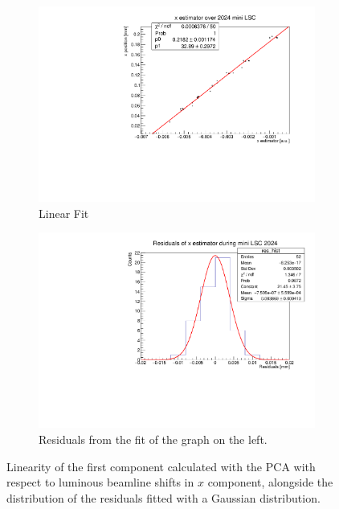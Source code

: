 \begin{figure}
    \centering
    \begin{subfigure}{0.48\textwidth}
    \includegraphics[width=\linewidth]{figures/x_res_new.pdf}
    \caption{Linear Fit}\label{fig:xfit_data}
    \end{subfigure}
    \begin{subfigure}{0.48\textwidth}
    \includegraphics[width=\linewidth]{figures/x_fit_new.pdf}
    \caption{Residuals from the fit of the graph on the left. }\label{fig:xres_data}
    \end{subfigure}
    \caption{Linearity of the first component calculated with the PCA with respect to luminous beamline shifts in $x$ component, alongside the distribution of the residuals fitted with a Gaussian distribution.}
    \label{fig:x_data}
\end{figure}


